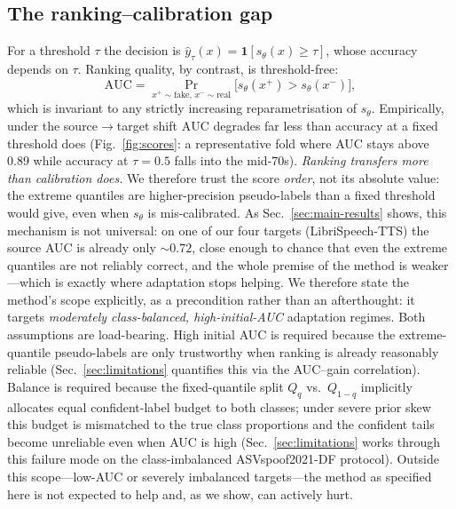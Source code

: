 \documentclass[conference]{IEEEtran}
\begin{document}
\subsection{The ranking--calibration gap}
\label{sec:rankcal}
For a threshold $\tau$ the decision is $\hat y_\tau(x)=\mathbf{1}[s_\theta(x)\ge\tau]$,
whose accuracy depends on $\tau$. Ranking quality, by contrast, is threshold-free:
\begin{equation}
\mathrm{AUC}=\Pr_{x^{+}\sim\mathrm{fake},\,x^{-}\sim\mathrm{real}}\!\big[s_\theta(x^{+})>s_\theta(x^{-})\big],
\end{equation}
which is invariant to any strictly increasing reparametrisation of $s_\theta$.
Empirically, under the source$\rightarrow$target shift $\mathrm{AUC}$ degrades far
less than accuracy at a fixed threshold does
(Fig.~\ref{fig:scores}: a representative fold where AUC stays above $0.89$ while
accuracy at $\tau{=}0.5$ falls into the mid-$70$s). \emph{Ranking transfers more
than calibration does.} We therefore trust the score \emph{order}, not its
absolute value: the extreme quantiles are higher-precision pseudo-labels than a
fixed threshold would give, even when $s_\theta$ is mis-calibrated. As
Sec.~\ref{sec:main-results} shows, this mechanism is not universal: on one of
our four targets (LibriSpeech-TTS) the source AUC is already only $\sim\!0.72$,
close enough to chance that even the extreme quantiles are not reliably
correct, and the whole premise of the method is weaker---which is exactly where
adaptation stops helping. We therefore state the method's scope explicitly,
as a precondition rather than an afterthought: it targets
\emph{moderately class-balanced, high-initial-AUC} adaptation regimes. Both
assumptions are load-bearing. High initial AUC is required because the
extreme-quantile pseudo-labels are only trustworthy when ranking is already
reasonably reliable (Sec.~\ref{sec:limitations} quantifies this via the
AUC--gain correlation). Balance is required because the fixed-quantile split
$Q_q$ vs.\ $Q_{1-q}$ implicitly allocates equal confident-label budget to both
classes; under severe prior skew this budget is mismatched to the true class
proportions and the confident tails become unreliable even when AUC is high
(Sec.~\ref{sec:limitations} works through this failure mode on the
class-imbalanced ASVspoof2021-DF protocol). Outside this scope---low-AUC or
severely imbalanced targets---the method as specified here is not expected to
help and, as we show, can actively hurt.
\end{document}
